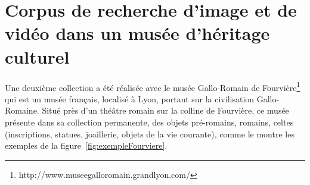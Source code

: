 %
%
\section{Corpus de recherche d'image et de vidéo dans un musée d'héritage culturel}
\label{sec:garofou}

Une deuxième collection a été réalisée avec le musée Gallo-Romain de Fourvière\footnote{http://www.museegalloromain.grandlyon.com/} qui est un musée français, localisé à Lyon, portant sur la civilisation Gallo-Romaine. 
Situé près d'un théâtre romain sur la colline de Fourvière, ce musée présente dans sa collection permanente, des objets pré-romains, romains, celtes (inscriptions, statues, joaillerie, objets de la vie courante), comme le montre les exemples de la figure~\ref{fig:exempleFourviere}.

